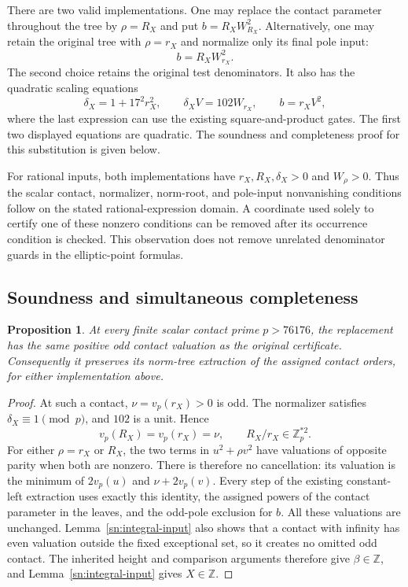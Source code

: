 \documentclass[11pt,a4paper]{article}
\newtheorem{proposition}[theorem]{Proposition}
\theoremstyle{definition}
\theoremstyle{remark}
\begin{document}
There are two valid implementations.  One may replace the contact
parameter throughout the tree by $\rho=R_X$ and put
$b=R_XW_{R_X}^2$.  Alternatively, one may retain the original
tree with $\rho=r_X$ and normalize only its final pole input:
\[
                       b=R_XW_{r_X}^2.
\]
The second choice retains the original test denominators.  It
also has the quadratic scaling equations
\[
        \delta_X=1+17^2r_X^2,\qquad
        \delta_X V=102W_{r_X},\qquad b=r_XV^2,
\]
where the last expression can use the existing square-and-product
gates.  The first two displayed equations are quadratic.
The soundness and completeness proof for this substitution is
given below.

For rational inputs, both implementations have $r_X,R_X,\delta_X>0$
and $W_\rho>0$.  Thus the scalar contact, normalizer, norm-root,
and pole-input nonvanishing conditions follow on the stated
rational-expression domain.  A coordinate used solely to certify
one of these nonzero conditions can be removed after its occurrence
condition is checked.  This observation does not remove unrelated
denominator guards in the elliptic-point formulas.

\subsection{Soundness and simultaneous completeness}

\begin{proposition}\label{sn:contact-preservation}
At every finite scalar contact prime $p>76176$, the replacement
has the same positive odd contact valuation as the original
certificate.  Consequently it preserves its norm-tree extraction
of the assigned contact orders, for either implementation above.
\end{proposition}
\begin{proof}
At such a contact, $\nu=v_p(r_X)>0$ is odd.  The normalizer
satisfies $\delta_X\equiv1\pmod p$, and $102$ is a unit.
Hence
\[
               v_p(R_X)=v_p(r_X)=\nu,
 \qquad R_X/r_X\in\mathbb Z_p^{*2}.
\]
For either $\rho=r_X$ or $R_X$, the two terms in
$u^2+\rho v^2$ have valuations of opposite parity when both
are nonzero.  There is therefore no cancellation: its valuation
is the minimum of $2v_p(u)$ and $\nu+2v_p(v)$.
Every step of the existing constant-left extraction uses exactly
this identity, the assigned powers of the contact parameter in
the leaves, and the odd-pole exclusion for $b$.  All these
valuations are unchanged.  Lemma~\ref{sn:integral-input}
also shows that a contact with infinity has even valuation
outside the fixed exceptional set, so it creates no omitted
odd contact.  The inherited height and comparison arguments
therefore give $\beta\in\mathbb Z$, and
Lemma~\ref{sn:integral-input} gives $X\in\mathbb Z$.
\end{proof}
\end{document}
